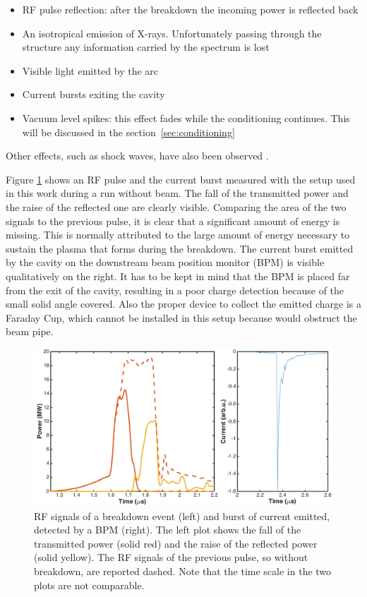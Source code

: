 \begin{itemize}
\item RF pulse reflection: after the breakdown the incoming power is reflected back
\item An isotropical emission of X-rays. Unfortunately passing through the structure any information carried by the spectrum is lost
\item Visible light emitted by the arc
\item Current bursts exiting the cavity
\item Vacuum level spikes: this effect fades while the conditioning continues. This will be discussed in the section~\ref{sec:conditioning} 
\end{itemize}
Other effects, such as shock waves, have also been observed \cite{Rajamaki:2143815}. 

Figure \ref{RFandBPM} shows an RF pulse and the current burst measured with the setup used in this work during a run without beam. The fall of the transmitted power and the raise of the reflected one are clearly visible. Comparing the area of the two signals to the previous pulse, it is clear that a significant amount of energy is missing. This is normally attributed to the large amount of energy necessary to sustain the plasma that forms during the breakdown. The current burst emitted by the cavity on the downstream beam position monitor (BPM) is visible qualitatively on the right. It has to be kept in mind that the BPM is placed far from the exit of the cavity, resulting in a poor charge detection because of the small solid angle covered. Also the proper device to collect the emitted charge is a Faraday Cup, which cannot be installed in this setup because would obstruct the beam pipe. 


\begin{figure}[h]
\centering
\includegraphics[scale=0.33]{pictures/RFandBPM.png}
\caption{RF signals of a breakdown event (left) and burst of current emitted, detected by a BPM (right). The left plot shows the fall of the transmitted power (solid red) and the raise of the reflected power (solid yellow). The RF signals of the previous pulse, so without breakdown, are reported dashed. Note that the time scale in the two plots are not comparable.}
\label{RFandBPM}
\end{figure}




